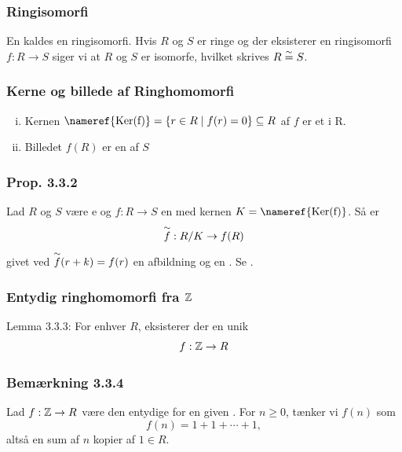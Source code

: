 \subsubsection{Ringisomorfi}
\label{Ringisomorfi}
En   kaldes en ringisomorfi. Hvis $R$
og $S$ er ringe og der eksisterer en ringisomorfi $f: R \rightarrow S$ siger vi
at $R$ og $S$ er isomorfe, hvilket skrives $R \overset{\sim}{=} S$.

\subsubsection{Kerne og billede af Ringhomomorfi}
\label{Kerne og billede af Ringhomomorfi}
\begin{enumerate}[(i)]
  \item Kernen $\text{\nameref{Ker(f)}} = \myset{r \in R \mid f(r) = 0}
  \subseteq R$ af $f$ er et  i R.
  \item Billedet $f(R)$ er en  af $S$
\end{enumerate}

\subsubsection{Prop. 3.3.2}
\label{Prop. 3.3.2}
Lad $R$ og $S$ være e og $f: R \rightarrow S$ en
 med kernen $K = \text{\nameref{Ker(f)}}$. Så er
\begin{equation*}
  \overset{\sim}{f} : R/K \rightarrow f(R)
\end{equation*}
givet ved $\overset{\sim}{f}(r + k) = f(r)$ en  afbildning og en
. Se .

\subsubsection{Entydig ringhomomorfi fra $\mathbb{Z}$}
\label{Entydig ringhomomorfi fra Z}
Lemma 3.3.3: For enhver  $R$, eksisterer der en unik
\begin{equation*}
  f: \mathbb{Z} \rightarrow R
\end{equation*}

\subsubsection{Bemærkning 3.3.4}
\label{Bemaerkning 3.3.4}
Lad $f: \mathbb{Z} \rightarrow R$ være den entydige  for en given
. For $n \geq 0$, tænker vi $f(n)$ som
\begin{equation*}
  f(n) = 1 + 1 + \cdots + 1,
\end{equation*}
altså en sum af $n$ kopier af $1 \in R$.


